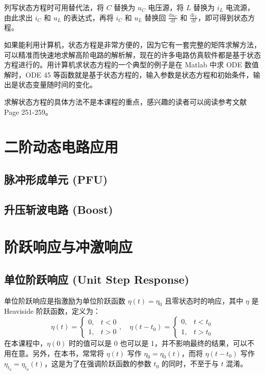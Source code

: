 \documentclass[UTF8]{report}
\theoremstyle{MyLineTheoremStyle} %
\theoremstyle{MyBlockTheoremStyle} %
\theoremstyle{MySubsubsectionStyle} %
\begin{document}
列写状态方程时可用替代法，将 $C$ 替换为 $u_C$ 电压源，将 $L$ 替换为 $i_L$ 电流源，由此求出 $i_C$ 和 $u_L$ 的表达式，再将 $i_C$ 和 $u_L$ 替换回 $\frac{\mathrm{d} u_C }{\mathrm{d} t }$ 和 $\frac{\mathrm{d} i_L }{\mathrm{d} t }$，即可得到状态方程。

如果能利用计算机，状态方程是非常方便的，因为它有一套完整的矩阵求解方法，可以精准而快速地求解高阶电路的解析解，现在的许多电路仿真软件都是基于状态方程进行的。用计算机求状态方程的一个典型的例子是在 Matlab 中求 ODE 数值解时，ODE 45 等函数就是基于状态方程的，输入参数是状态方程和初始条件，输出是状态变量随时间的变化。

求解状态方程的具体方法不是本课程的重点，感兴趣的读者可以阅读参考文献 \cite{电路原理} Page 251-259。

\section{二阶动态电路应用}
\subsection{脉冲形成单元 (PFU)}
\subsection{升压斩波电路 (Boost)}

\section{阶跃响应与冲激响应}

\subsection{单位阶跃响应 (Unit Step Response)}
单位阶跃响应是指激励为单位阶跃函数 $\eta(t) = \eta_0$ 且零状态时的响应，其中 $\eta$ 是 Heaviside 阶跃函数，定义为：
\begin{equation}
\eta(t) =
\begin{cases}
    0, & t < 0 \\
    1, & t > 0
\end{cases},\quad \eta(t - t_0) = 
\begin{cases}
    0, & t < t_0 \\
    1, & t > t_0
\end{cases}
\end{equation}
在本课程中，$\eta(0)$ 时的值可以是 0 也可以是 1，并不影响最终的结果，可以不用在意。另外，在本书，常常将 $\eta(t)$ 写作 $\eta_0 = \eta_0(t)$，而将 $\eta(t - t_0) $ 写作 $\eta_{t_0} = \eta_{t_0}(t)$，这是为了在强调阶跃函数的参数 $t_0$ 的同时，不至于与 $t$ 混淆。
\end{document}
